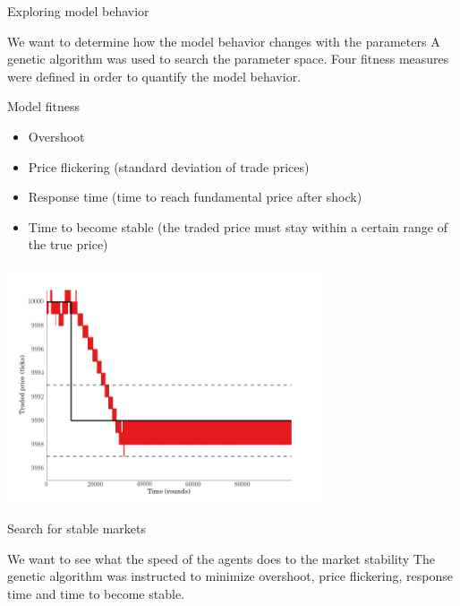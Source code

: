 \documentclass[14pt]{beamer}
\begin{document}
\begin{frame}{Exploring model behavior}
\begin{block}{We want to determine how the model behavior changes with the parameters}
A genetic algorithm was used to search the parameter space. Four fitness measures were defined in order to quantify the model behavior.
\end{block}
\end{frame}

\begin{frame}{Model fitness}
\begin{itemize}
\item Overshoot
\item Price flickering (standard deviation of trade prices)
\item Response time (time to reach fundamental price after shock)
\item Time to become stable (the traded price must stay within a certain range of the true price)
\end{itemize}
\end{frame}

\begin{frame}
\begin{center}
\includegraphics[width=0.7\textwidth]{market_cases/a_stable_within_margin.png}
\end{center}
\end{frame}

\begin{frame}{Search for stable markets}
\begin{block}{We want to see what the speed of the agents does to the market stability}
The genetic algorithm was instructed to minimize overshoot, price flickering, response time and time to become stable.
\end{block}
\end{frame}
\end{document}
